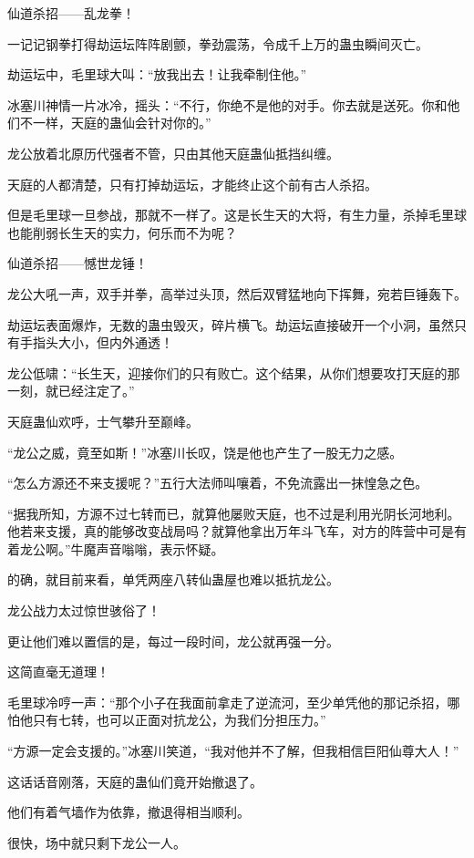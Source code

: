 \begin{this_body}
仙道杀招——乱龙拳！

一记记钢拳打得劫运坛阵阵剧颤，拳劲震荡，令成千上万的蛊虫瞬间灭亡。

劫运坛中，毛里球大叫：“放我出去！让我牵制住他。”

冰塞川神情一片冰冷，摇头：“不行，你绝不是他的对手。你去就是送死。你和他们不一样，天庭的蛊仙会针对你的。”

龙公放着北原历代强者不管，只由其他天庭蛊仙抵挡纠缠。

天庭的人都清楚，只有打掉劫运坛，才能终止这个前有古人杀招。

但是毛里球一旦参战，那就不一样了。这是长生天的大将，有生力量，杀掉毛里球也能削弱长生天的实力，何乐而不为呢？

仙道杀招——憾世龙锤！

龙公大吼一声，双手并拳，高举过头顶，然后双臂猛地向下挥舞，宛若巨锤轰下。

劫运坛表面爆炸，无数的蛊虫毁灭，碎片横飞。劫运坛直接破开一个小洞，虽然只有手指头大小，但内外通透！

龙公低啸：“长生天，迎接你们的只有败亡。这个结果，从你们想要攻打天庭的那一刻，就已经注定了。”

天庭蛊仙欢呼，士气攀升至巅峰。

“龙公之威，竟至如斯！”冰塞川长叹，饶是他也产生了一股无力之感。

“怎么方源还不来支援呢？”五行大法师叫嚷着，不免流露出一抹惶急之色。

“据我所知，方源不过七转而已，就算他屡败天庭，也不过是利用光阴长河地利。他若来支援，真的能够改变战局吗？就算他拿出万年斗飞车，对方的阵营中可是有着龙公啊。”牛魔声音嗡嗡，表示怀疑。

的确，就目前来看，单凭两座八转仙蛊屋也难以抵抗龙公。

龙公战力太过惊世骇俗了！

更让他们难以置信的是，每过一段时间，龙公就再强一分。

这简直毫无道理！

毛里球冷哼一声：“那个小子在我面前拿走了逆流河，至少单凭他的那记杀招，哪怕他只有七转，也可以正面对抗龙公，为我们分担压力。”

“方源一定会支援的。”冰塞川笑道，“我对他并不了解，但我相信巨阳仙尊大人！”

这话话音刚落，天庭的蛊仙们竟开始撤退了。

他们有着气墙作为依靠，撤退得相当顺利。

很快，场中就只剩下龙公一人。


\end{this_body}
